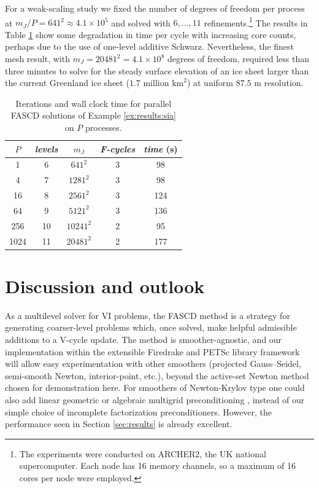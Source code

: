 \documentclass[review,hidelinks,onefignum,onetabnum]{siamart220329}
\begin{document}
\begin{example}
For a weak-scaling study we fixed the number of degrees of freedom per process at $m_J/P=641^2 \approx 4.1 \times 10^5$ and solved with $6, \dots, 11$ refinements.\footnote{The experiments were conducted on ARCHER2, the UK national supercomputer. Each node has 16 memory channels, so a maximum of 16 cores per node were employed.}  The results in Table \ref{tab:results:siaweak} show some degradation in time per cycle with increasing core counts, perhaps due to the use of one-level additive Schwarz.  Nevertheless, the finest mesh result, with $m_J=20481^2=4.1 \times 10^8$ degrees of freedom, required less than three minutes to solve for the steady surface elevation of an ice sheet larger than the current Greenland ice sheet ($1.7$ million $\text{km}^2$) at uniform $87.5$ m resolution.

\begin{table}[ht]
\centering
\begin{tabular}{c@{\hskip 4mm}c@{\hskip 4mm}c@{\hskip 7mm}c@{\hskip 4mm}c}
\toprule
$P$ & \emph{levels} & $m_J$ & \emph{F-cycles} & \emph{time} (s) \\
\midrule
 1 & 6 & $641^2$ & 3 & 98 \\
 4 & 7 & $1281^2$ & 3 & 98 \\
 16 & 8 & $2561^2$ & 3 & 124 \\
 64 & 9 & $5121^2$ & 3 & 136 \\
 256 & 10 & $10241^2$ & 2 & 95 \\
 1024 & 11 & $20481^2$ & 2 & 177 \\
 \bottomrule
\end{tabular}
\bigskip
\caption{Iterations and wall clock time for parallel FASCD solutions of Example \ref{ex:results:sia} on $P$ processes.}
\label{tab:results:siaweak}
\end{table}
\end{example}


\section{Discussion and outlook} \label{sec:discussion}

As a multilevel solver for VI problems, the FASCD method is a strategy for generating coarser-level problems which, once solved, make helpful admissible additions to a V-cycle update.  The method is smoother-agnostic, and our implementation within the extensible Firedrake \cite{Rathgeberetal2016} and PETSc \cite{Balayetal2023} library framework will allow easy experimentation with other smoothers (projected Gauss--Seidel, semi-smooth Newton, interior-point, etc.), beyond the active-set Newton method chosen for demonstration here.  For smoothers of Newton-Krylov type one could also add linear geometric or algebraic multigrid preconditioning \cite{Trottenbergetal2001}, instead of our simple choice of incomplete factorization preconditioners.  However, the performance seen in Section \ref{sec:results} is already excellent.
\end{document}
